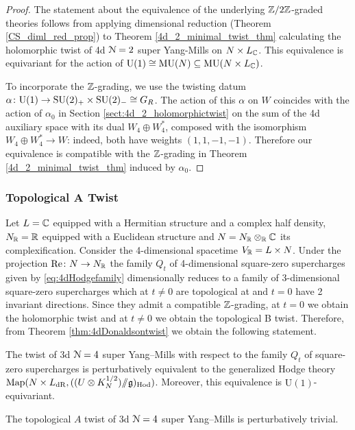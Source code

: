 \documentclass[10pt, oneside]{article}
\newcommand{\MU}{\mathrm{MU}}
\renewcommand{\Re}{\mathrm{Re}}
\renewcommand{\U}{\mathrm{U}}
\newcommand{\ham}{/\!\!/}
\begin{document}
\begin{proof}
The statement about the equivalence of the underlying $\mathbb Z/2\mathbb Z$-graded theories follows from applying dimensional reduction (Theorem \ref{CS_diml_red_prop}) to Theorem \ref{4d_2_minimal_twist_thm} calculating the holomorphic twist of 4d $\mathcal{N}=2$ super Yang-Mills on $N \times L_\mathbb C$.  This equivalence is equivariant for the action of $\mr U(1) \iso \MU(N) \sub \MU(N \times L_\CC)$.

To incorporate the $\mathbb Z$-grading, we use the twisting datum $\alpha \colon \mathrm{U}(1) \to \mathrm{SU}(2)_+ \times \mathrm{SU}(2)_- \cong G_R$.  The action of this $\alpha$ on $W$ coincides with the action of $\alpha_0$ in Section \ref{sect:4d_2_holomorphictwist} on the sum of the 4d auxiliary space with its dual $W_4 \oplus W_4^*$, composed with the isomorphism $W_4 \oplus W_4^* \to W$: indeed, both have weights $(1,1,-1,-1)$.  Therefore our equivalence is compatible with the $\mathbb Z$-grading in Theorem \ref{4d_2_minimal_twist_thm} induced by $\alpha_0$.
\end{proof}

\subsubsection{Topological A Twist}
\label{sect:3d_4_A_twist}
Let $L=\mathbb C$ equipped with a Hermitian structure and a complex half density, $N_\mathbb R=\mathbb R$ equipped with a Euclidean structure and $N=N_\mathbb R\otimes_\mathbb R\mathbb C$ its complexification. Consider the 4-dimensional spacetime $V_\mathbb R=L\times N$. Under the projection $\Re\colon N\rightarrow N_\RR$ the family $Q_t$ of 4-dimensional square-zero supercharges given by \eqref{eq:4dHodgefamily} dimensionally reduces to a family of 3-dimensional square-zero supercharges which at $t\neq 0$ are topological at and $t=0$ have 2 invariant directions. Since they admit a compatible $\mathbb Z$-grading, at $t=0$ we obtain the holomorphic twist and at $t\neq 0$ we obtain the topological B twist. Therefore, from Theorem \ref{thm:4dDonaldsontwist} we obtain the following statement.

\begin{theorem}
The twist of 3d $\mathcal N=4$ super Yang--Mills with respect to the family $Q_t$ of square-zero supercharges is perturbatively equivalent to the generalized Hodge theory $\mr{Map}(N \times L_{\mr{dR}}, ((U \otimes K^{1/2}_N)\ham \gg)_{\mr{Hod}})$. Moreover, this equivalence is $\U(1)$-equivariant.
\label{3d_4_A_twist_thm}
\end{theorem}

\begin{corollary}
The topological $A$ twist of 3d $\mathcal N=4$ super Yang--Mills is perturbatively trivial.
\end{corollary}
\end{document}
